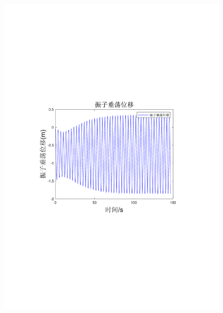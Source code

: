 \documentclass[12pt,utf8]{article}
\begin{document}
\begin{figure}[htbp]
\begin{minipage}{0.45\linewidth}
	\end{minipage}
	\begin{minipage}{0.45\linewidth}
		\includegraphics[width=0.9\linewidth]{figures/振子垂荡位移.pdf}
	\end{minipage}
	\begin{minipage}{0.45\linewidth}

\end{minipage}
\end{figure}
\end{document}

